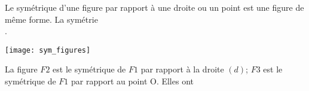 \begin{myprop}
	Le symétrique d'une figure par rapport à une droite ou un point est une figure de même forme. La symétrie  \\ .
\end{myprop}

\begin{myex}
	\begin{center}
		\texttt{[image: sym\_figures]}
	\end{center}
	
	La figure $F2$ est le symétrique de $F1$ par rapport à la droite $(d)$; $F3$ est le symétrique de $F1$ par rapport au point O.
	Elles ont \\
\end{myex}

